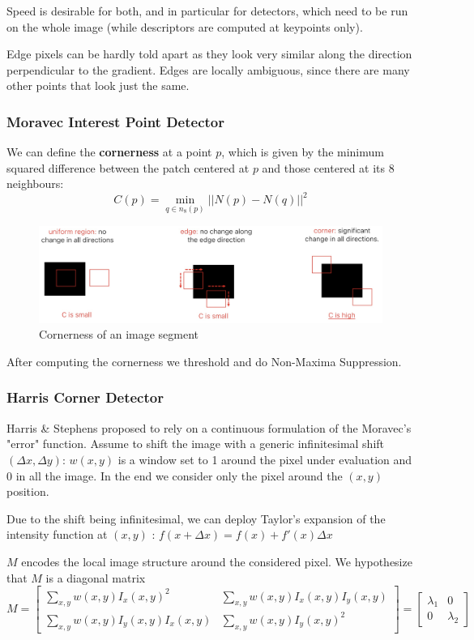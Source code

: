 Speed is desirable for both, and in particular for detectors, which need to be run on the whole image (while descriptors are computed at keypoints only).

Edge pixels can be hardly told apart as they look very similar along the direction perpendicular to the gradient.
Edges are locally ambiguous, since there are many other points that look just the same.

\subsubsection{Moravec Interest Point Detector}
We can define the \textbf{cornerness} at a point $p$, which is given by the minimum squared difference between the patch centered at $p$ and those centered at its 8 neighbours: 
$$C(p) = \min_{q \in n_8(p)} ||N(p) - N(q)||^2$$

\begin{figure}[htbp]
  \centering
  \includegraphics[width=0.9\linewidth]{./img/cornerness.jpg}
  \caption{Cornerness of an image segment}
  \label{fig:cornerness}
\end{figure}

After computing the cornerness we threshold and do Non-Maxima Suppression.

\subsubsection{Harris Corner Detector}

Harris \& Stephens proposed to rely on a continuous formulation of the Moravec's "error" function.
Assume to shift the image with a generic infinitesimal shift $(\Delta x, \Delta y)$:
$w(x,y)$ is a window set to 1 around the pixel under evaluation and 0 in all the image.
In the end we consider only the pixel around the $(x,y)$ position.

Due to the shift being infinitesimal, we can deploy Taylor's expansion of the intensity function at $(x,y)$ : $f(x + \Delta x) = f(x) + f'(x) \Delta x$

$M$ encodes the local image structure around the considered pixel.
We hypothesize that $M$ is a diagonal matrix
$M =
\begin{bmatrix}
\sum_{x,y} w(x,y) I_x(x,y)^2 & \sum_{x,y} w(x,y) I_x(x,y) I_y(x,y) \\
\sum_{x,y} w(x,y) I_y(x,y) I_x(x,y) & \sum_{x,y} w(x,y) I_y(x,y)^2
\end{bmatrix}
=
\begin{bmatrix}
\lambda_1 & 0 \\
0 & \lambda_2
\end{bmatrix}$

